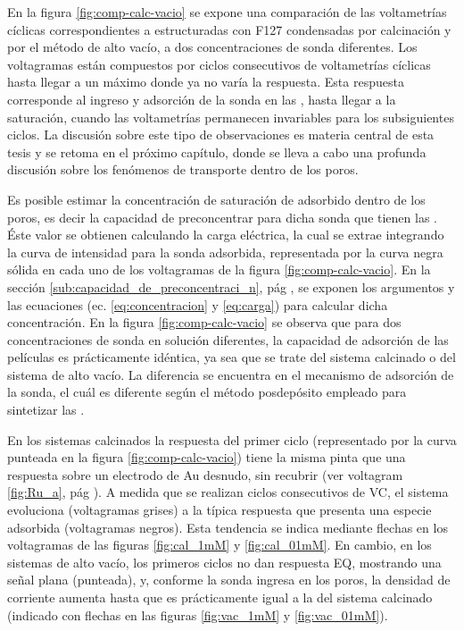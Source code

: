 	  En la figura \ref{fig:comp-calc-vacio} se expone una comparación de las voltametrías cíclicas correspondientes a \pdm\space estructuradas con F127 condensadas por calcinación y por el método de alto vacío, a dos concentraciones de sonda diferentes. Los voltagramas están compuestos por ciclos consecutivos de voltametrías cíclicas hasta llegar a un máximo donde ya no varía la respuesta. Esta respuesta corresponde al ingreso y adsorción de la sonda en las \pdm, hasta llegar a la saturación, cuando las voltametrías permanecen invariables para los subsiguientes ciclos. La discusión sobre este tipo de observaciones  es materia central de esta tesis y se retoma en el próximo capítulo, donde se lleva a cabo una profunda discusión sobre los fenómenos de transporte dentro de los poros.

      Es posible estimar la concentración de saturación de \ru\space adsorbido dentro de los poros, es decir la capacidad de preconcentrar para dicha sonda que tienen las \pdm. Éste valor se obtienen calculando la carga eléctrica, la cual se extrae integrando la curva de intensidad para la sonda adsorbida, representada por la curva negra sólida en cada uno de los voltagramas de la figura \ref{fig:comp-calc-vacio}. En la sección \ref{sub:capacidad_de_preconcentraci_n}, pág \pageref{sub:capacidad_de_preconcentraci_n}, se exponen los argumentos y las ecuaciones (ec. \ref{eq:concentracion} y \ref{eq:carga}) para calcular dicha concentración. En la figura \ref{fig:comp-calc-vacio} se observa que para dos concentraciones de sonda en solución diferentes, la capacidad de adsorción de las películas es prácticamente idéntica, ya sea que se trate del sistema calcinado o del sistema de alto vacío. La diferencia se encuentra en el mecanismo de adsorción de la sonda, el cuál es diferente según el método posdepósito empleado para sintetizar las \pdm.

      En los sistemas calcinados la respuesta del primer ciclo (representado por la curva punteada en la figura \ref{fig:comp-calc-vacio}) tiene la misma pinta que una respuesta sobre un electrodo de Au desnudo, sin recubrir (ver voltagram \ref{fig:Ru_a}, pág \pageref{fig:Ru_a}). A medida que se realizan ciclos consecutivos de VC, el sistema evoluciona (voltagramas grises) a la típica respuesta que presenta una especie adsorbida (voltagramas negros). Esta tendencia se indica mediante flechas en los voltagramas de las figuras \ref{fig:cal_1mM} y \ref{fig:cal_01mM}. En cambio, en los sistemas de alto vacío, los primeros ciclos no dan respuesta EQ, mostrando una señal plana (punteada), y, conforme la sonda ingresa en los poros, la densidad de corriente aumenta hasta que es prácticamente igual a la del sistema calcinado (indicado con flechas en las figuras \ref{fig:vac_1mM} y \ref{fig:vac_01mM}). 

